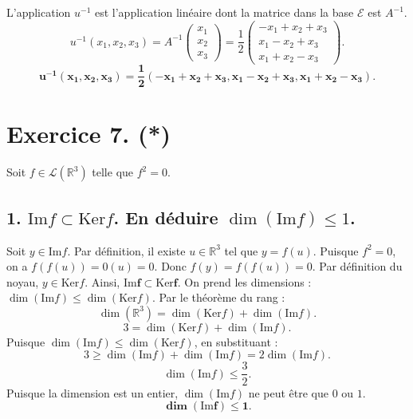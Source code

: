 \documentclass[french]{yLectureNote}
\begin{document}
L'application $u^{-1}$ est l'application linéaire dont la matrice dans la base $\mathcal{E}$ est $A^{-1}$.
$$u^{-1}(x_1,x_2,x_3) = A^{-1} \begin{pmatrix} x_1 \\ x_2 \\ x_3 \end{pmatrix} = \frac{1}{2} \begin{pmatrix} -x_1+x_2+x_3 \\ x_1-x_2+x_3 \\ x_1+x_2-x_3 \end{pmatrix}.$$
$$\mathbf{u^{-1}(x_{1},x_{2},x_{3}) = \frac{1}{2}(-x_{1}+x_{2}+x_{3}, x_{1}-x_{2}+x_{3}, x_{1}+x_{2}-x_{3}).}$$

\section*{Exercice 7. (*)}
Soit $f \in \mathcal{L}(\mathbb{R}^3)$ telle que $f^2 = 0$.

\subsection*{1. $\mathrm{Im}f \subset \mathrm{Ker}f$. En déduire $\dim(\mathrm{Im}f) \le 1$.}
Soit $y \in \mathrm{Im}f$. Par définition, il existe $u \in \mathbb{R}^3$ tel que $y = f(u)$.
Puisque $f^2 = 0$, on a $f(f(u)) = 0(u) = 0$.
Donc $f(y) = f(f(u)) = 0$.
Par définition du noyau, $y \in \mathrm{Ker}f$.
Ainsi, $\mathbf{\mathrm{Im}f \subset \mathrm{Ker}f}$.
On prend les dimensions : $\dim(\mathrm{Im}f) \le \dim(\mathrm{Ker}f)$.
Par le théorème du rang :
$$\dim(\mathbb{R}^3) = \dim(\mathrm{Ker}f) + \dim(\mathrm{Im}f).$$
$$3 = \dim(\mathrm{Ker}f) + \dim(\mathrm{Im}f).$$
Puisque $\dim(\mathrm{Im}f) \le \dim(\mathrm{Ker}f)$, en substituant :
$$3 \ge \dim(\mathrm{Im}f) + \dim(\mathrm{Im}f) = 2 \dim(\mathrm{Im}f).$$
$$\dim(\mathrm{Im}f) \le \frac{3}{2}.$$
Puisque la dimension est un entier, $\dim(\mathrm{Im}f)$ ne peut être que $0$ ou $1$.
$$\mathbf{\dim(\mathrm{Im}f) \le 1}.$$
\end{document}
